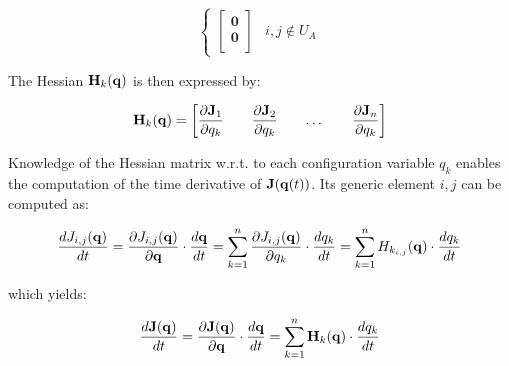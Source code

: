 \documentclass[10pt,landscape,a4paper]{article}
\begin{document}
\begin{multicols}{2}
\begin{equation}
\begin{cases}
\begin{bmatrix}
\mathbf{0} \\ 
\mathbf{0} \\
\end{bmatrix} & i,j \not\in U_A
\end{cases}
\end{equation}

The Hessian $\mathbf H_k(\mathbf q)$ is then expressed by:

\begin{equation}
\mathbf H_k(\mathbf q) =
\begin{bmatrix}
\dfrac{\partial \mathbf J_1}{\partial q_k} && \dfrac{\partial \mathbf J_2}{\partial q_k} && \dots && \dfrac{\partial \mathbf J_n}{\partial q_k}
\end{bmatrix}
\end{equation}

Knowledge of the Hessian matrix w.r.t. to each configuration variable $q_k$ enables the computation of the time derivative of $\mathbf J(\mathbf q(t))$. Its generic element $i,j$ can be computed as:

\begin{equation}
\begin{aligned}
\dfrac{d J_{i,j}(\mathbf q)}{dt}
=
\dfrac{\partial J_{i,j}(\mathbf q)}{\partial \mathbf q} \cdot \dfrac{d\mathbf q}{dt}
=
\sum_{k=1}^{n} \dfrac{\partial J_{i,j}(\mathbf q)}{\partial q_k} \cdot \dfrac{dq_k}{dt}
=
\sum_{k=1}^{n} H_{k_{i,j}}(\mathbf q) \cdot \dfrac{dq_k}{dt}
\end{aligned}
\end{equation}

which yields:

\begin{equation}
\dfrac{d\mathbf J(\mathbf q)}{dt}
=
\dfrac{\partial \mathbf J(\mathbf q)}{\partial \mathbf q} \cdot \dfrac{d\mathbf q}{dt}
=
\sum_{k=1}^{n} \mathbf{H}_k(\mathbf q) \cdot  \dfrac{dq_k}{dt}
\end{equation}


\clearpage




\end{multicols}
\end{document}
